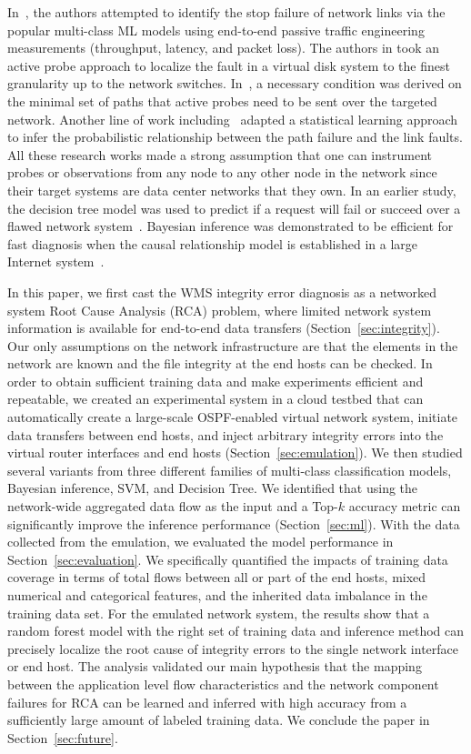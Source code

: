 In~\cite{Link-JIoT-2019}, the authors attempted to identify the stop failure of network links via the popular multi-class ML models using end-to-end passive traffic engineering measurements (throughput, latency, and packet loss). The authors in \cite{DeepView:NSDI18} took an active probe approach to localize the fault in a virtual disk system to the finest granularity up to the network switches. In~\cite{netbouncer:nsdi18}, a necessary condition was derived on the minimal set of paths that active probes need to be sent over the targeted network. Another line of work including~\cite{NetPoirot:Sigcomm2016,KDD14} adapted a statistical learning approach to infer the probabilistic relationship between the path failure and the link faults. All these research works made a strong assumption that one can instrument probes or observations from any node to any other node in the network since their target systems are data center networks that they own. In an earlier study, the decision tree model was used to predict if a request will fail or succeed over a flawed network system~\cite{DT:2004}. Bayesian inference was demonstrated to be efficient for fast diagnosis when the causal relationship model is established in a large Internet system~\cite{BN-Internet:2007}.

In this paper, we first cast the WMS integrity error diagnosis as a networked system Root Cause Analysis (RCA) problem, where limited network system information is available for end-to-end data transfers (Section~\ref{sec:integrity}). Our only assumptions on the network infrastructure are that the elements in the network are known and the file integrity at the end hosts can be checked. In order to obtain sufficient training data and make experiments efficient and repeatable, we created an experimental system in a cloud testbed that can automatically create a large-scale OSPF-enabled virtual network system, initiate data transfers between end hosts, and inject arbitrary integrity errors into the virtual router interfaces and end hosts (Section~\ref{sec:emulation}). We then studied several variants from three different families of multi-class classification models, Bayesian inference, SVM, and Decision Tree. We identified that using the network-wide aggregated data flow as the input and a Top-$k$ accuracy metric can significantly improve the inference performance (Section~\ref{sec:ml}). With the data collected from the emulation, we evaluated the model performance in Section~\ref{sec:evaluation}. We specifically quantified the impacts of training data coverage in terms of total flows between all or part of the end hosts, mixed numerical and categorical features, and the inherited data imbalance in the training data set. For the emulated network system, the results show that a random forest model with the right set of training data and inference method can precisely localize the root cause of integrity errors to the single network interface or end host. The analysis validated our main hypothesis that the mapping between the application level flow characteristics and the network component failures for RCA can be learned and inferred with high accuracy from a sufficiently large amount of labeled training data. We conclude the paper in Section~\ref{sec:future}.
